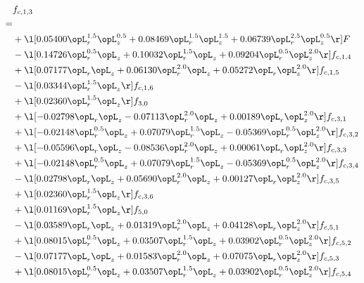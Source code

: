 \begin{alignat}{2} 
\label{eq:f_13_2} 
& f_{c,1,3} \nonumber \\ 
 = \\ 
& + \l[  0.05400 \opL_r^{1.5} \opL_z^{0.5} +  0.08469 \opL_r^{1.5} \opL_z^{1.5} +  0.06739 \opL_r^{2.5} \opL_z^{0.5}  \r] F \nonumber \\ 
& - \l[  0.14726 \opL_r^{0.5} \opL_z +  0.10032 \opL_r^{1.5} \opL_z +  0.09204 \opL_r^{0.5} \opL_z^{2.0}  \r] f_{c,1,4} \nonumber \\ 
& + \l[  0.07177 \opL_r \opL_z +  0.06130 \opL_r^{2.0} \opL_z +  0.05272 \opL_r \opL_z^{2.0}  \r] f_{c,1,5} \nonumber \\ 
& - \l[  0.03344 \opL_r^{1.5} \opL_z  \r] f_{c,1,6} \nonumber \\ 
& + \l[  0.02360 \opL_r^{1.5} \opL_z  \r] f_{3,0} \nonumber \\ 
& + \l[  -0.02798 \opL_r \opL_z   -0.07113 \opL_r^{2.0} \opL_z +  0.00189 \opL_r \opL_z^{2.0}  \r] f_{c,3,1} \nonumber \\ 
& + \l[  -0.02148 \opL_r^{0.5} \opL_z +  0.07079 \opL_r^{1.5} \opL_z   -0.05369 \opL_r^{0.5} \opL_z^{2.0}  \r] f_{c,3,2} \nonumber \\ 
& + \l[  -0.05596 \opL_r \opL_z   -0.08536 \opL_r^{2.0} \opL_z +  0.00061 \opL_r \opL_z^{2.0}  \r] f_{c,3,3} \nonumber \\ 
& + \l[  -0.02148 \opL_r^{0.5} \opL_z +  0.07079 \opL_r^{1.5} \opL_z   -0.05369 \opL_r^{0.5} \opL_z^{2.0}  \r] f_{c,3,4} \nonumber \\ 
& - \l[  0.02798 \opL_r \opL_z +  0.05690 \opL_r^{2.0} \opL_z +  0.00127 \opL_r \opL_z^{2.0}  \r] f_{c,3,5} \nonumber \\ 
& + \l[  0.02360 \opL_r^{1.5} \opL_z  \r] f_{c,3,6} \nonumber \\ 
& + \l[  0.01169 \opL_r^{1.5} \opL_z  \r] f_{5,0} \nonumber \\ 
& - \l[  0.03589 \opL_r \opL_z +  0.01319 \opL_r^{2.0} \opL_z +  0.04128 \opL_r \opL_z^{2.0}  \r] f_{c,5,1} \nonumber \\ 
& + \l[  0.08015 \opL_r^{0.5} \opL_z +  0.03507 \opL_r^{1.5} \opL_z +  0.03902 \opL_r^{0.5} \opL_z^{2.0}  \r] f_{c,5,2} \nonumber \\ 
& - \l[  0.07177 \opL_r \opL_z +  0.01583 \opL_r^{2.0} \opL_z +  0.07075 \opL_r \opL_z^{2.0}  \r] f_{c,5,3} \nonumber \\ 
& + \l[  0.08015 \opL_r^{0.5} \opL_z +  0.03507 \opL_r^{1.5} \opL_z +  0.03902 \opL_r^{0.5} \opL_z^{2.0}  \r] f_{c,5,4} \nonumber \\ 

\end{alignat}
